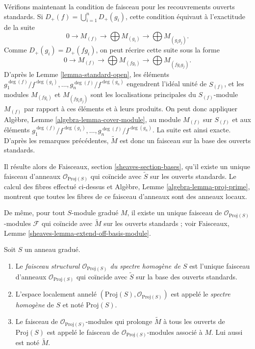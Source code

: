 \medskip\noindent
Vérifions maintenant la condition de
faisceau pour les recouvrements ouverts
standards. Si
$D_{+}(f) = \bigcup_{i = 1}^n D_{+}(g_i)$, cette condition équivaut à
l'exactitude de la suite
$$
0 \to M_{(f)} \to \bigoplus M_{(g_i)} \to \bigoplus M_{(g_ig_j)}.
$$
Comme $D_{+}(g_i) = D_{+}(fg_i)$, on
peut récrire cette suite sous la forme
$$
0 \to M_{(f)} \to \bigoplus M_{(fg_i)} \to \bigoplus M_{(fg_ig_j)}.
$$
D'après le Lemme \ref{lemma-standard-open}, les éléments
$g_1^{\deg(f)}/f^{\deg(g_1)}, \ldots, g_n^{\deg(f)}/f^{\deg(g_n)}$
engendrent l'idéal unité de $S_{(f)}$, et les modules
$M_{(fg_i)}$ et $M_{(fg_ig_j)}$ sont les localisations principales du
$S_{(f)}$-module $M_{(f)}$ par rapport à ces éléments et à leurs produits.
On peut donc appliquer Algèbre, Lemme \ref{algebra-lemma-cover-module},
au module $M_{(f)}$ sur $S_{(f)}$ et aux éléments
$g_1^{\deg(f)}/f^{\deg(g_1)}, \ldots, g_n^{\deg(f)}/f^{\deg(g_n)}$.
La suite est ainsi exacte. D'après les remarques précédentes,
$\widetilde M$ est donc un faisceau sur la base des ouverts standards.

\medskip\noindent
Il résulte alors de Faisceaux, section \ref{sheaves-section-bases}, qu'il
existe un unique faisceau d'anneaux
$\mathcal{O}_{\text{Proj}(S)}$ qui coïncide
avec $\widetilde S$ sur les ouverts
standards. Le calcul des fibres effectué
ci-dessus et Algèbre, Lemme
\ref{algebra-lemma-proj-prime}, montrent que toutes
les fibres de ce faisceau d'anneaux sont des anneaux locaux.

\medskip\noindent
De même, pour tout $S$-module gradué $M$, il existe un
unique faisceau de $\mathcal{O}_{\text{Proj}(S)}$-modules
$\mathcal{F}$ qui coïncide avec
$\widetilde M$ sur les ouverts standards ; voir Faisceaux,
Lemme \ref{sheaves-lemma-extend-off-basis-module}.

\begin{definition}
\label{definition-structure-sheaf}
Soit $S$ un anneau gradué.
\begin{enumerate}
\item Le {\it faisceau structural $\mathcal{O}_{\text{Proj}(S)}$ du spectre
homogène de $S$} est l'unique faisceau d'anneaux
$\mathcal{O}_{\text{Proj}(S)}$ qui coïncide avec $\widetilde S$ sur la base
des ouverts standards.
\item L'espace localement annelé
$(\text{Proj}(S), \mathcal{O}_{\text{Proj}(S)})$ est appelé le
{\it spectre homogène} de $S$ et noté $\text{Proj}(S)$.
\item Le faisceau de $\mathcal{O}_{\text{Proj}(S)}$-modules qui prolonge
$\widetilde M$ à tous les ouverts de
$\text{Proj}(S)$ est appelé le faisceau
de $\mathcal{O}_{\text{Proj}(S)}$-modules associé à $M$. Lui aussi est noté
$\widetilde M$.
\end{enumerate}
\end{definition}

